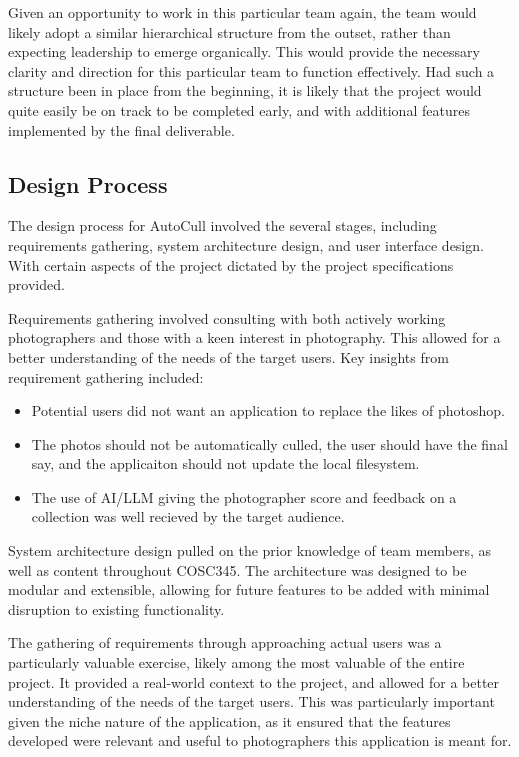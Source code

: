 \documentclass[conference]{IEEEtran}
\begin{document}
Given an opportunity to work in this particular team again, the team would likely adopt a similar hierarchical structure from the outset, rather than expecting leadership to emerge organically. This would provide the necessary clarity and direction for this particular team to function effectively. Had such a structure been in place from the beginning, it is likely that the project would quite easily be on track to be completed early, and with additional features implemented by the final deliverable.

\subsection{Design Process}
The design process for AutoCull involved the several stages, including requirements gathering, system architecture design, and user interface design. With certain aspects of the project dictated by the project specifications provided.

Requirements gathering involved consulting with both actively working photographers and those with a keen interest in photography. This allowed for a better understanding of the needs of the target users. Key insights from requirement gathering included:
\begin{itemize}
    \item Potential users did not want an application to replace the likes of photoshop.
    \item The photos should not be automatically culled, the user should have the final say, and the applicaiton should not update the local filesystem.
    \item The use of AI/LLM giving the photographer score and feedback on a collection was well recieved by the target audience.
\end{itemize}

System architecture design pulled on the prior knowledge of team members, as well as content throughout COSC345. The architecture was designed to be modular and extensible, allowing for future features to be added with minimal disruption to existing functionality.

The gathering of requirements through approaching actual users was a particularly valuable exercise, likely among the most valuable of the entire project. It provided a real-world context to the project, and allowed for a better understanding of the needs of the target users. This was particularly important given the niche nature of the application, as it ensured that the features developed were relevant and useful to photographers this application is meant for.
\end{document}
